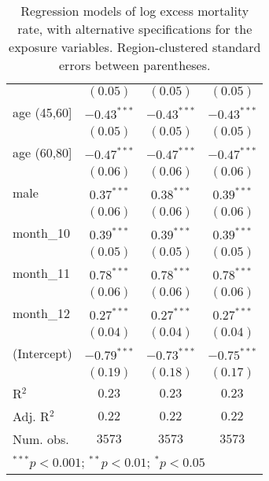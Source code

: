 \begin{table}
\begin{center}
\begin{tabular}{l c c c}
                    & $(0.05)$      & $(0.05)$      & $(0.05)$      \\
age (45,60]         & $-0.43^{***}$ & $-0.43^{***}$ & $-0.43^{***}$ \\
                    & $(0.05)$      & $(0.05)$      & $(0.05)$      \\
age (60,80]         & $-0.47^{***}$ & $-0.47^{***}$ & $-0.47^{***}$ \\
                    & $(0.06)$      & $(0.06)$      & $(0.06)$      \\
male                & $0.37^{***}$  & $0.38^{***}$  & $0.39^{***}$  \\
                    & $(0.06)$      & $(0.06)$      & $(0.06)$      \\
month\_10           & $0.39^{***}$  & $0.39^{***}$  & $0.39^{***}$  \\
                    & $(0.05)$      & $(0.05)$      & $(0.05)$      \\
month\_11           & $0.78^{***}$  & $0.78^{***}$  & $0.78^{***}$  \\
                    & $(0.06)$      & $(0.06)$      & $(0.06)$      \\
month\_12           & $0.27^{***}$  & $0.27^{***}$  & $0.27^{***}$  \\
                    & $(0.04)$      & $(0.04)$      & $(0.04)$      \\
(Intercept)         & $-0.79^{***}$ & $-0.73^{***}$ & $-0.75^{***}$ \\
                    & $(0.19)$      & $(0.18)$      & $(0.17)$      \\
\hline
R$^2$               & $0.23$        & $0.23$        & $0.23$        \\
Adj. R$^2$          & $0.22$        & $0.22$        & $0.22$        \\
Num. obs.           & $3573$        & $3573$        & $3573$        \\
\hline
\multicolumn{4}{l}{\scriptsize{$^{***}p<0.001$; $^{**}p<0.01$; $^{*}p<0.05$}}
\end{tabular}
\caption{Regression models of log excess mortality rate, with alternative specifications for the exposure variables. Region-clustered standard errors between parentheses.}
\label{tab:altspecmodels}
\end{center}
\end{table}
